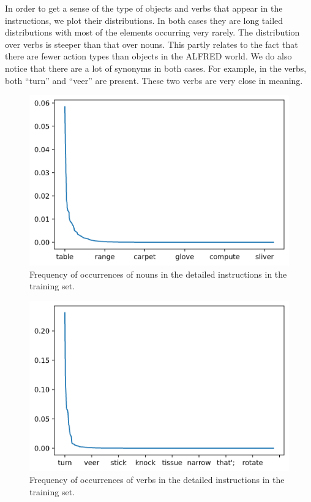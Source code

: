 \documentclass[11pt,a4paper]{article}
\begin{document}
In order to get a sense of the type of objects and verbs that appear in the instructions, we plot their distributions. In both cases they are long tailed distributions with most of the elements occurring very rarely. The distribution over verbs is steeper than that over nouns. This partly relates to the fact that there are fewer action types than objects in the ALFRED world. We do also notice that there are a lot of synonyms in both cases. For example, in the verbs, both ``turn'' and ``veer'' are present. These two verbs are very close in meaning.

\begin{figure}
    \centering
    \includegraphics[width=\linewidth]{Reports/1-Task-Definition-and-Data/train_noun_dist.png}
    \caption{Frequency of occurrences of nouns in the detailed instructions in the training set.}
    \label{fig:nouns_train}
\end{figure}

\begin{figure}
    \centering
    \includegraphics[width=\linewidth]{Reports/1-Task-Definition-and-Data/train_verb_dist.png}
    \caption{Frequency of occurrences of verbs in the detailed instructions in the training set.}
    \label{fig:nouns_train}
\end{figure}
\end{document}
